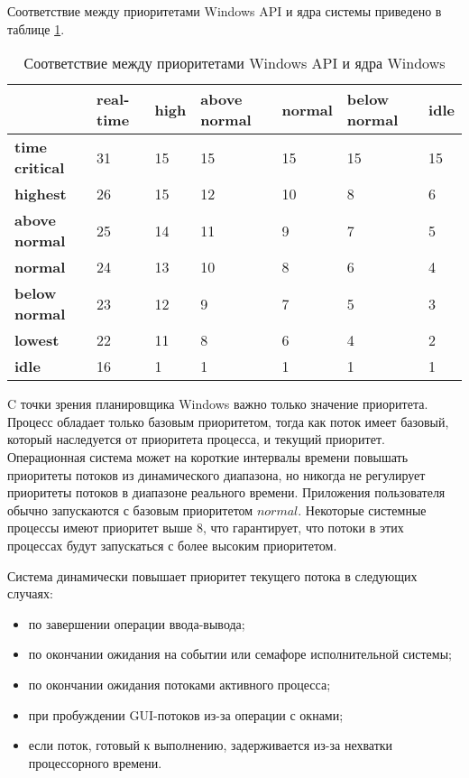 Соответствие между приоритетами {\ttfamily Windows API} и ядра системы приведено в таблице \ref{tbl:priority}.
\begin{table}[h]
	\caption{Соответствие между приоритетами Windows API и ядра Windows}
	\begin{center}
		\begin{tabular}{|l|p{45pt}|p{45pt}|p{45pt}|p{45pt}|p{45pt}|p{45pt}|} 
			\hline
			{} & \textbf{real-time} & \textbf{high} & \textbf{above normal} & \textbf{normal} & \textbf{below normal} & \textbf{idle}\\
			\hline
			\textbf{time critical} & 31 & 15 & 15 & 15 & 15 & 15 \\
			\hline
			\textbf{highest} & 26 & 15 & 12 & 10 & 8 & 6 \\
			\hline
			\textbf{above normal} & 25 & 14 & 11 & 9 & 7 & 5 \\
			\hline
			\textbf{normal} & 24 & 13 & 10 & 8 & 6 & 4 \\
			\hline
			\textbf{below normal} & 23 & 12 & 9 & 7 & 5 & 3 \\
			\hline
			\textbf{lowest} & 22 & 11 & 8 & 6 & 4 & 2 \\
			\hline
			\textbf{idle} & 16 & 1 & 1 & 1 & 1 & 1 \\
			\hline
		\end{tabular}
	\end{center}
	\label{tbl:priority}
\end{table}

C точки зрения планировщика {\ttfamily Windows} важно только значение приоритета.
Процесс обладает только базовым приоритетом, тогда как поток имеет базовый, который наследуется от приоритета процесса, и текущий приоритет. Операционная система может на короткие интервалы времени повышать приоритеты потоков из динамического диапазона, но никогда не регулирует приоритеты потоков в диапазоне реального времени.
Приложения пользователя обычно запускаются с базовым приоритетом $normal$. Некоторые системные процессы имеют приоритет выше 8, что гарантирует, что потоки в этих процессах будут запускаться с более высоким приоритетом.

Система динамически повышает приоритет текущего потока в следующих случаях:
\begin{itemize}
	\item по завершении операции ввода-вывода;
	\item по окончании ожидания на событии или семафоре исполнительной системы;
	\item по окончании ожидания потоками активного процесса;
	\item при пробуждении {\ttfamily GUI}-потоков из-за операции с окнами;
	\item если поток, готовый к выполнению, задерживается из-за нехватки процессорного времени.
\end{itemize}

